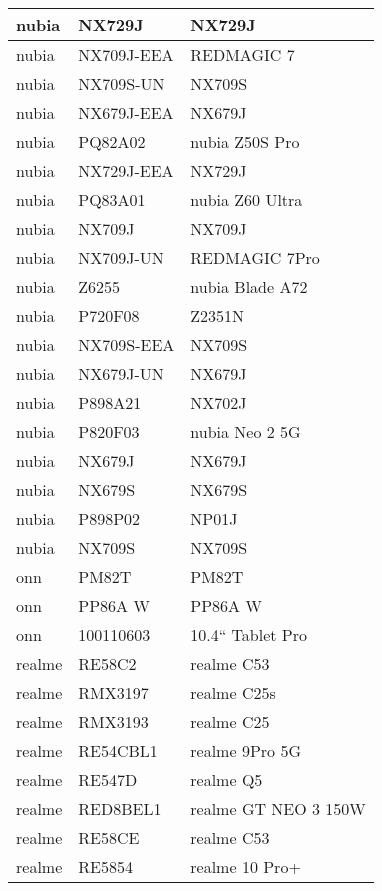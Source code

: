\begin{tabularx}{\linewidth}{|l|X|X|}
        nubia & NX729J & NX729J \\ \hline
        nubia & NX709J-EEA & REDMAGIC 7 \\ \hline
        nubia & NX709S-UN & NX709S \\ \hline
        nubia & NX679J-EEA & NX679J \\ \hline
        nubia & PQ82A02 & nubia Z50S Pro \\ \hline
        nubia & NX729J-EEA & NX729J \\ \hline
        nubia & PQ83A01 & nubia Z60 Ultra \\ \hline
        nubia & NX709J & NX709J \\ \hline
        nubia & NX709J-UN & REDMAGIC 7Pro \\ \hline
        nubia & Z6255 & nubia Blade A72 \\ \hline
        nubia & P720F08 & Z2351N \\ \hline
        nubia & NX709S-EEA & NX709S \\ \hline
        nubia & NX679J-UN & NX679J \\ \hline
        nubia & P898A21 & NX702J \\ \hline
        nubia & P820F03 & nubia Neo 2 5G \\ \hline
        nubia & NX679J & NX679J \\ \hline
        nubia & NX679S & NX679S \\ \hline
        nubia & P898P02 & NP01J \\ \hline
        nubia & NX709S & NX709S \\ \hline
        onn & PM82T & PM82T \\ \hline
        onn & PP86A W & PP86A W \\ \hline
        onn & 100110603 & 10.4“ Tablet Pro \\ \hline
        realme & RE58C2 & realme C53 \\ \hline
        realme & RMX3197 & realme C25s \\ \hline
        realme & RMX3193 & realme C25 \\ \hline
        realme & RE54CBL1 & realme 9Pro 5G \\ \hline
        realme & RE547D & realme Q5 \\ \hline
        realme & RED8BEL1 & realme GT NEO 3 150W \\ \hline
        realme & RE58CE & realme C53 \\ \hline
        realme & RE5854 & realme 10 Pro+ \\ \hline

\end{tabularx}

